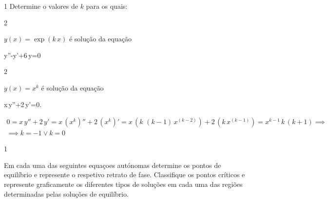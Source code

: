 \documentclass["./AM3C.exercises_resolutions.2024.tex"]{subfiles}
\begin{document}
\begin{questionBox}1{} %
  Determine o valores de \(k\) para os quais:
\end{questionBox}

\begin{questionBox}2{} %

  \(y(x)=\exp{(k\,x)}\) é solução da equação
  \begin{BM}
    y''-y'+6\,y=0
  \end{BM}

\end{questionBox}

\begin{questionBox}2{} %

  \(y(x)=x^k\) é solução da equação
  \begin{BM}
    x\,y''+2\,y'=0.
  \end{BM}

  \answer{}

  \begin{gather*}
    0
    = x\,y''+2\,y'
    = x\,(
      x^k
    )''+2\,(
      x^k
    )'
    = x\,(
      k\,\,(k-1)\,x^(k-2)
    )+2\,(
      k\,x^(k-1)
    )
    = x^{k-1}\,k\,(
      k+1
    )
    \implies \\
    \implies
    k = - 1 \lor k = 0
  \end{gather*}
\end{questionBox}

\begin{questionBox}1{} %

  Em cada uma das seguintes equaçoes autónomas determine os pontos de equilíbrio e represente o respetivo retrato de fase. Classiﬁque os pontos críticos e represente graﬁcamente os diferentes tipos de soluções em cada uma das regiões determinadas pelas soluções de equilíbrio.

\end{questionBox}
\end{document}
